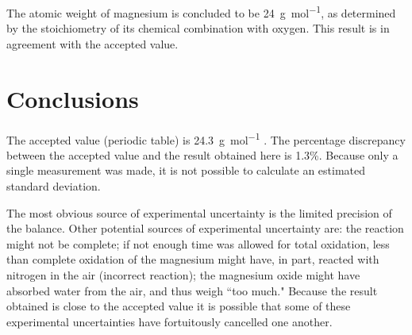 \documentclass{article}
\begin{document}
 The atomic weight of magnesium is concluded to be \SI{24}{\gram\per\mol}, as determined by the stoichiometry of its chemical combination with oxygen. This result is in agreement with the accepted value.

%

 \section{Conclusions}

 The accepted value (periodic table) is \SI{24.3}{\gram\per\mole} \cite{Smith:2012qr}. The percentage discrepancy between the accepted value and the result obtained here is 1.3\%. Because only a single measurement was made, it is not possible to calculate an estimated standard deviation.

 The most obvious source of experimental uncertainty is the limited precision of the balance. Other potential sources of experimental uncertainty are: the reaction might not be complete; if not enough time was allowed for total oxidation, less than complete oxidation of the magnesium might have, in part, reacted with nitrogen in the air (incorrect reaction); the magnesium oxide might have absorbed water from the air, and thus weigh ``too much." Because the result obtained is close to the accepted value it is possible that some of these experimental uncertainties have fortuitously cancelled one another.





 

 



 
\end{document}
